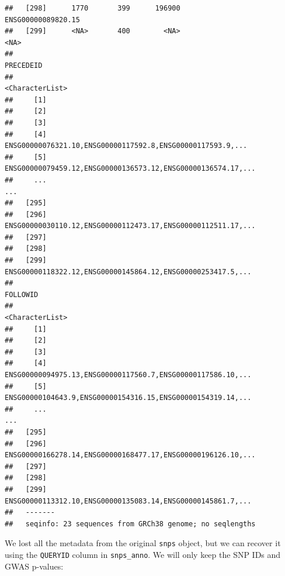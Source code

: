\documentclass[9pt,a4paper,]{extarticle}
\newenvironment{Shaded}{\begin{snugshade}}{\end{snugshade}}
\newcommand{\KeywordTok}[1]{\textcolor[rgb]{0.13,0.29,0.53}{\textbf{#1}}}
\newcommand{\StringTok}[1]{\textcolor[rgb]{0.31,0.60,0.02}{#1}}
\newcommand{\OperatorTok}[1]{\textcolor[rgb]{0.81,0.36,0.00}{\textbf{#1}}}
\newcommand{\NormalTok}[1]{#1}
\begin{document}
\begin{verbatim}
##   [298]      1770       399      196900               ENSG00000089820.15
##   [299]      <NA>       400        <NA>                             <NA>
##                                                            PRECEDEID
##                                                      <CharacterList>
##     [1]                                                             
##     [2]                                                             
##     [3]                                                             
##     [4]   ENSG00000076321.10,ENSG00000117592.8,ENSG00000117593.9,...
##     [5] ENSG00000079459.12,ENSG00000136573.12,ENSG00000136574.17,...
##     ...                                                          ...
##   [295]                                                             
##   [296] ENSG00000030110.12,ENSG00000112473.17,ENSG00000112511.17,...
##   [297]                                                             
##   [298]                                                             
##   [299]  ENSG00000118322.12,ENSG00000145864.12,ENSG00000253417.5,...
##                                                             FOLLOWID
##                                                      <CharacterList>
##     [1]                                                             
##     [2]                                                             
##     [3]                                                             
##     [4]  ENSG00000094975.13,ENSG00000117560.7,ENSG00000117586.10,...
##     [5]  ENSG00000104643.9,ENSG00000154316.15,ENSG00000154319.14,...
##     ...                                                          ...
##   [295]                                                             
##   [296] ENSG00000166278.14,ENSG00000168477.17,ENSG00000196126.10,...
##   [297]                                                             
##   [298]                                                             
##   [299]  ENSG00000113312.10,ENSG00000135083.14,ENSG00000145861.7,...
##   -------
##   seqinfo: 23 sequences from GRCh38 genome; no seqlengths
\end{verbatim}

We lost all the metadata from the original \texttt{snps} object, but we can recover it using the \texttt{QUERYID} column in \texttt{snps\_anno}.
We will only keep the SNP IDs and GWAS p-values:

\begin{Shaded}
\end{Shaded}
\end{document}
